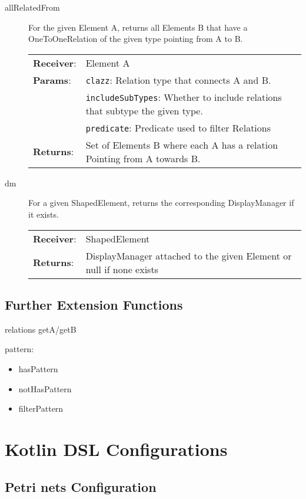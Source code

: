 \begin{description}
  \item[allRelatedFrom] For the given Element A, returns all Elements B that have a OneToOneRelation of the given type pointing from A to B.

        \begin{tabularx}{\linewidth}{ l X }
          \textbf{Receiver}: & Element A
          \\
          \textbf{Params}:   & \texttt{clazz}: Relation type that connects A and B.
          \\
                             & \texttt{includeSubTypes}: Whether to include relations that subtype the given type.
          \\
                             & \texttt{predicate}: Predicate used to filter Relations
          \\
          \textbf{Returns}:  & Set of Elements B where each A has a relation Pointing from A towards B.
        \end{tabularx}
  
  \item[dm] For a given ShapedElement, returns the corresponding DisplayManager if it exists.
  \begin{tabularx}{\linewidth}{ l X }
    \textbf{Receiver}: & ShapedElement
    \\
    \textbf{Returns}:  & DisplayManager attached to the given Element or null if none exists
  \end{tabularx}
\end{description}

\section*{Further Extension Functions}

relations getA/getB
 

pattern:
\begin{itemize}
  \item hasPattern
  \item notHasPattern
  \item filterPattern
\end{itemize}


\chapter{Kotlin DSL Configurations}
\section{Petri nets Configuration}
\label{app:petri}
